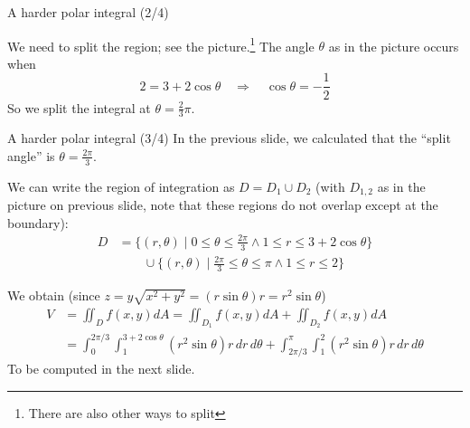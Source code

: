 \begin{frame}{A harder polar integral (2/4)}
\begin{minipage}{0.45\textwidth}
%
            \end{minipage}\begin{minipage}{0.45\textwidth}
                \pause We need to split the region; see the picture.\footnote{There are also other ways to split} The angle $\theta$ as in the picture occurs when \[2=3+2\cos\theta\quad\Rightarrow\quad\cos\theta=-\frac{1}{2}\]
                \pause So we split the integral at $\theta=\frac{2}{3}\pi$.
                
            \end{minipage}
\end{frame}




\begin{frame}{A harder polar integral (3/4)}
    \footnotesize
                In the previous slide, we calculated that the ``split angle'' is $\theta=\frac{2\pi}{3}$.  

            \pause We can write the region of integration as $D=D_1\cup D_2$ (with $D_{1,2}$ as in the picture on previous slide, note that these regions do not overlap except at the boundary):
            \begin{align*}D &=\{(r,\theta) \mid 0\leq\theta\leq\frac{2\pi}{3} \land 1\leq r\leq 3+2\cos\theta \}\\&\qquad\cup\{(r,\theta) \mid \frac{2\pi}{3}\leq\theta\leq\pi \land 1\leq r\leq2\}\end{align*}

            \pause We obtain (since $z=y\sqrt{x^2+y^2}=(r\sin\theta)r=r^2\sin\theta$) \begin{align*}V&=\iint_{D}f(x,y)dA=\iint_{D_1}f(x,y)dA+\iint_{D_2}f(x,y)dA\\&=\int_0^{2\pi/3}\int_1^{3+2\cos\theta}(r^2\sin\theta)r\,dr\,d\theta+\int_{2\pi/3}^{\pi}\int_{1}^2(r^2\sin\theta) r\,dr\,d\theta\end{align*}
            To be computed in the next slide.

\end{frame}

